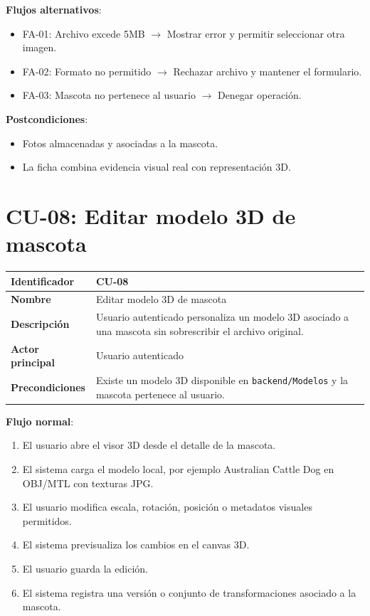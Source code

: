 \documentclass[12pt,a4paper]{article}
\begin{document}
\textbf{Flujos alternativos}:
\begin{itemize}[leftmargin=*]
    \item FA-01: Archivo excede 5MB $\rightarrow$ Mostrar error y permitir seleccionar otra imagen.
    \item FA-02: Formato no permitido $\rightarrow$ Rechazar archivo y mantener el formulario.
    \item FA-03: Mascota no pertenece al usuario $\rightarrow$ Denegar operaci\'on.
\end{itemize}

\textbf{Postcondiciones}:
\begin{itemize}[leftmargin=*]
    \item Fotos almacenadas y asociadas a la mascota.
    \item La ficha combina evidencia visual real con representaci\'on 3D.
\end{itemize}

\newpage
\section{CU-08: Editar modelo 3D de mascota}

\begin{tabular}{|p{3.5cm}|p{10cm}|}
\hline
\textbf{Identificador} & CU-08 \\
\hline
\textbf{Nombre} & Editar modelo 3D de mascota \\
\hline
\textbf{Descripci\'on} & Usuario autenticado personaliza un modelo 3D asociado a una mascota sin sobrescribir el archivo original. \\
\hline
\textbf{Actor principal} & Usuario autenticado \\
\hline
\textbf{Precondiciones} & Existe un modelo 3D disponible en \texttt{backend/Modelos} y la mascota pertenece al usuario. \\
\hline
\end{tabular}

\vspace{0.5em}

\textbf{Flujo normal}:
\begin{enumerate}[leftmargin=*]
    \item El usuario abre el visor 3D desde el detalle de la mascota.
    \item El sistema carga el modelo local, por ejemplo Australian Cattle Dog en OBJ/MTL con texturas JPG.
    \item El usuario modifica escala, rotaci\'on, posici\'on o metadatos visuales permitidos.
    \item El sistema previsualiza los cambios en el canvas 3D.
    \item El usuario guarda la edici\'on.
    \item El sistema registra una versi\'on o conjunto de transformaciones asociado a la mascota.
\end{enumerate}
\end{document}
